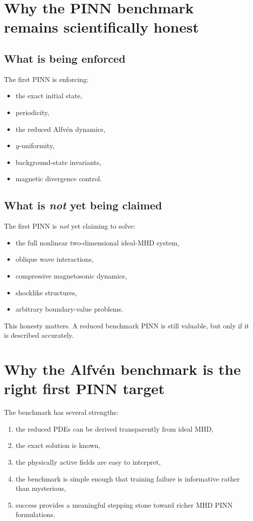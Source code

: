 \documentclass[11pt]{article}
\begin{document}
\section{Why the PINN benchmark remains scientifically honest}

\subsection{What is being enforced}
The first PINN is enforcing:
\begin{itemize}[leftmargin=1.8em]
    \item the exact initial state,
    \item periodicity,
    \item the reduced Alfv\'en dynamics,
    \item $y$-uniformity,
    \item background-state invariants,
    \item magnetic divergence control.
\end{itemize}

\subsection{What is \emph{not} yet being claimed}
The first PINN is \emph{not} yet claiming to solve:
\begin{itemize}[leftmargin=1.8em]
    \item the full nonlinear two-dimensional ideal-MHD system,
    \item oblique wave interactions,
    \item compressive magnetosonic dynamics,
    \item shocklike structures,
    \item arbitrary boundary-value problems.
\end{itemize}
This honesty matters. A reduced benchmark PINN is still valuable, but only if it is described accurately.

\section{Why the Alfv\'en benchmark is the right first PINN target}
The benchmark has several strengths:
\begin{enumerate}[leftmargin=1.8em]
    \item the reduced PDEs can be derived transparently from ideal MHD,
    \item the exact solution is known,
    \item the physically active fields are easy to interpret,
    \item the benchmark is simple enough that training failure is informative rather than mysterious,
    \item success provides a meaningful stepping stone toward richer MHD PINN formulations.
\end{enumerate}
\end{document}
